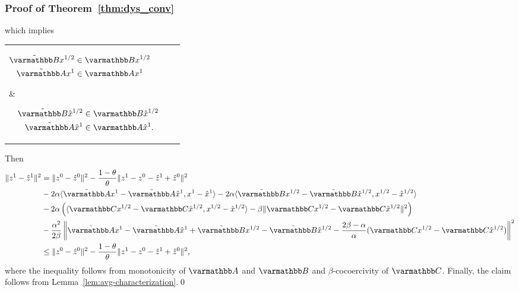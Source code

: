 \documentclass[10pt,mathserif]{beamer}
\begin{document}
\begin{frame}[plain]
\frametitle{Proof of Theorem~\ref{thm:dys_conv}}
which implies
\begin{center}
\begin{tabular}{l|l}
\parbox{0.3\linewidth}{%
\begin{align*}
\tilde{\opB}x^{1/2}&\in\opB x^{1/2}\qquad
\\
\tilde{\opA}x^{1}&\in \opA x^{1}
\end{align*}}
&
\parbox{0.3\linewidth}{%
\begin{align*}
\tilde{\opB}\hat{x}^{1/2}&\in \opB \hat{x}^{1/2}
\\
\tilde{\opA}\hat{x}^{1}&\in \opA \hat{x}^{1}.
\end{align*}}
\end{tabular}
\end{center}
Then
\begin{align*}
\|z^{1}-\hat{z}^1\|^2&=\|z^{0}-\hat{z}^0\|^2-\frac{1-\theta}{\theta}\|z^{1}-z^0-\hat{z}^1+\hat{z}^0\|^2\\
&
-2\alpha\langle\tilde{\opA} x^{1}-\tilde{\opA} \hat{x}^{1},x^{1}-\hat{x}^{1}\rangle
-2\alpha\langle\tilde{\opB} x^{1/2}-\tilde{\opB} \hat{x}^{1/2},x^{1/2}-\hat{x}^{1/2}\rangle
\\
&-2\alpha\left(\langle\opC x^{1/2}-\opC \hat{x}^{1/2},x^{1/2}-\hat{x}^{1/2}\rangle-\beta\|\opC x^{1/2}-\opC \hat{x}^{1/2}\|^2\right)\\
&-\frac{\alpha^2}{2\beta}\left\|\tilde{\opA} x^{1}-\tilde{\opA} \hat{x}^{1}+\tilde{\opB} x^{1/2}-\tilde{\opB} \hat{x}^{1/2}-\frac{2\beta-\alpha}{\alpha}(\opC x^{1/2}-\opC \hat{x}^{1/2})\right\|^2\\
&\le\|z^{0}-\hat{z}^0\|^2-\frac{1-\theta}{\theta}\|z^{1}-z^0-\hat{z}^1+\hat{z}^0\|^2,
\end{align*}
where the inequality follows from monotonicity of $\opA$ and $\opB$ and $\beta$-cocoercivity of $\opC$.
Finally, the claim follows from Lemma~\ref{lem:avg-characterization}.\qed
\end{frame}
\end{document}
